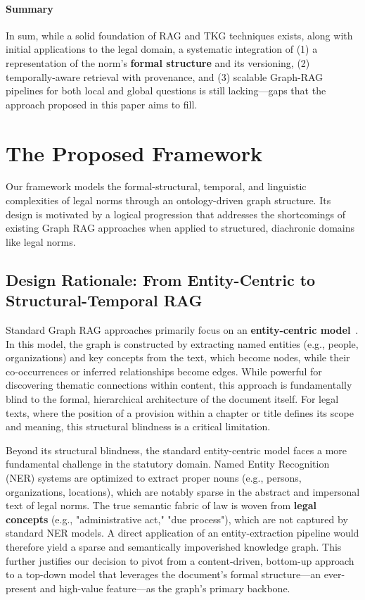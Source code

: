 \documentclass[11pt]{article}
\begin{document}
\paragraph{Summary} In sum, while a solid foundation of RAG and TKG techniques exists, along with initial applications to the legal domain, a systematic integration of (1) a representation of the norm's \textbf{formal structure} and its versioning, (2) temporally-aware retrieval with provenance, and (3) scalable Graph-RAG pipelines for both local and global questions is still lacking—gaps that the approach proposed in this paper aims to fill.

\section{The Proposed Framework}
\label{sec:framework}

Our framework models the formal-structural, temporal, and linguistic complexities of legal norms through an ontology-driven graph structure. Its design is motivated by a logical progression that addresses the shortcomings of existing Graph RAG approaches when applied to structured, diachronic domains like legal norms.

\subsection{Design Rationale: From Entity-Centric to Structural-Temporal RAG}
\label{sec:design_rationale}

Standard Graph RAG approaches primarily focus on an \textbf{entity-centric model}~\cite{edge2024graphrag}. In this model, the graph is constructed by extracting named entities (e.g., people, organizations) and key concepts from the text, which become nodes, while their co-occurrences or inferred relationships become edges. While powerful for discovering thematic connections within content, this approach is fundamentally blind to the formal, hierarchical architecture of the document itself. For legal texts, where the position of a provision within a chapter or title defines its scope and meaning, this structural blindness is a critical limitation.

Beyond its structural blindness, the standard entity-centric model faces a more fundamental challenge in the statutory domain. Named Entity Recognition (NER) systems are optimized to extract proper nouns (e.g., persons, organizations, locations), which are notably sparse in the abstract and impersonal text of legal norms. The true semantic fabric of law is woven from \textbf{legal concepts} (e.g., "administrative act," "due process"), which are not captured by standard NER models. A direct application of an entity-extraction pipeline would therefore yield a sparse and semantically impoverished knowledge graph. This further justifies our decision to pivot from a content-driven, bottom-up approach to a top-down model that leverages the document's formal structure—an ever-present and high-value feature—as the graph's primary backbone.
\end{document}
